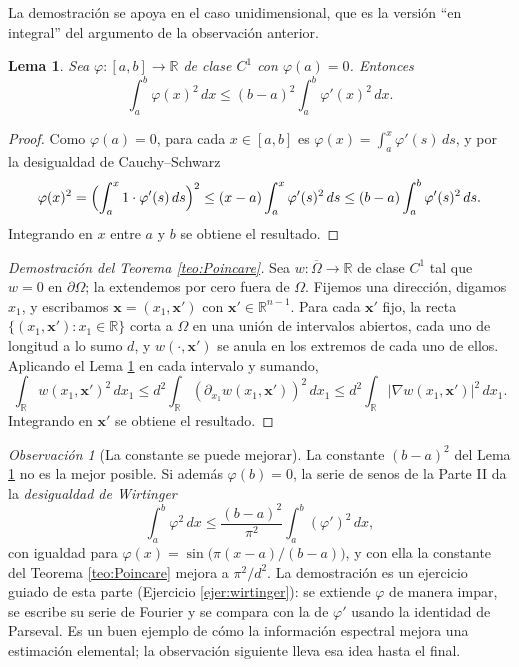\documentclass[12pt, a4paper]{amsbook}
\newcommand{\R}{{\mathbb R}}
\newcommand{\xx}{{\mathbf x}}
\newtheorem{lema}[teo]{Lema}
\theoremstyle{remark}
\newtheorem{obs}[teo]{Observación}
\theoremstyle{definition}
\numberwithin{section}{chapter}
\numberwithin{subsection}{section}
\numberwithin{equation}{section}
\numberwithin{figure}{chapter}
\begin{document}
La demostración se apoya en el caso unidimensional, que es la versión ``en integral'' del argumento de la observación anterior.

\begin{lema}\label{lema:poincare-1d}
Sea $\varphi\colon[a,b]\to\R$ de clase $C^1$ con $\varphi(a)=0$. Entonces
$$
\int_a^b \varphi(x)^2\, dx \le (b-a)^2\int_a^b \varphi'(x)^2\, dx .
$$
\end{lema}

\begin{proof}
Como $\varphi(a)=0$, para cada $x\in[a,b]$ es $\varphi(x) = \int_a^x \varphi'(s)\, ds$, y por la desigualdad de Cauchy--Schwarz
$$
\varphi(x)^2 = \Bigl(\int_a^x 1\cdot\varphi'(s)\, ds\Bigr)^2 \le (x-a)\int_a^x \varphi'(s)^2\, ds \le (b-a)\int_a^b \varphi'(s)^2\, ds .
$$
Integrando en $x$ entre $a$ y $b$ se obtiene el resultado.
\end{proof}

\begin{proof}[Demostración del Teorema \ref{teo:Poincare}]
Sea $w\colon \overline{\Omega}\to\R$ de clase $C^1$ tal que $w=0$ en $\partial\Omega$; la extendemos por cero fuera de $\Omega$. Fijemos una dirección, digamos $x_1$, y escribamos $\xx = (x_1,\xx')$ con $\xx'\in\R^{n-1}$. Para cada $\xx'$ fijo, la recta $\{(x_1,\xx')\colon x_1\in\R\}$ corta a $\Omega$ en una unión de intervalos abiertos, cada uno de longitud a lo sumo $d$, y $w(\cdot,\xx')$ se anula en los extremos de cada uno de ellos. Aplicando el Lema \ref{lema:poincare-1d} en cada intervalo y sumando,
$$
\int_{\R} w(x_1,\xx')^2\, dx_1 \le d^2\int_\R (\partial_{x_1}w(x_1,\xx'))^2\, dx_1 \le d^2\int_\R |\nabla w(x_1,\xx')|^2\, dx_1 .
$$
Integrando en $\xx'$ se obtiene el resultado.
\end{proof}

\begin{obs}[La constante se puede mejorar]\label{obs:wirtinger}
La constante $(b-a)^2$ del Lema \ref{lema:poincare-1d} no es la mejor posible. Si además $\varphi(b)=0$, la serie de senos de la Parte II da la \emph{desigualdad de Wirtinger}
$$
\int_a^b \varphi^2\, dx \le \frac{(b-a)^2}{\pi^2}\int_a^b (\varphi')^2\, dx,
$$
con igualdad para $\varphi(x)=\sin\bigl(\pi(x-a)/(b-a)\bigr)$, y con ella la constante del Teorema \ref{teo:Poincare} mejora a $\pi^2/d^2$. La demostración es un ejercicio guiado de esta parte (Ejercicio \ref{ejer:wirtinger}): se extiende $\varphi$ de manera impar, se escribe su serie de Fourier y se compara con la de $\varphi'$ usando la identidad de Parseval. Es un buen ejemplo de cómo la información espectral mejora una estimación elemental; la observación siguiente lleva esa idea hasta el final.
\end{obs}
\end{document}
